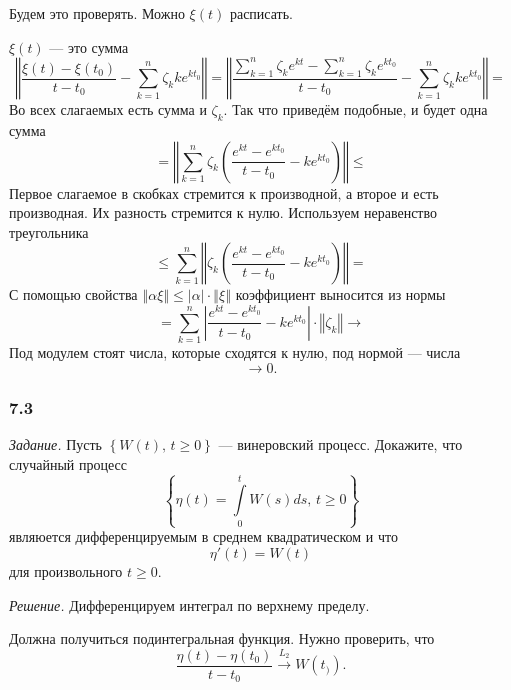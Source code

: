 Будем это проверять.
Можно $ \xi \left( t \right) $ расписать.

$ \xi \left( t \right) $ --- это сумма
$$ \left \Vert
    \frac{ \xi \left( t \right) - \xi \left( t_0 \right) }{t - t_0} -
    \sum \limits_{k = 1}^n \zeta_k k e^{kt_0} \right \Vert =
  \left \Vert
    \frac{ \sum \limits_{k = 1}^n \zeta_k e^{kt} - \sum \limits_{k = 1}^n \zeta_k e^{kt_0}}{t - t_0} -
    \sum \limits_{k = 1}^n \zeta_k ke^{kt_0} \right \Vert =$$
Во всех слагаемых есть сумма и $ \zeta_k$.
Так что приведём подобные, и будет одна сумма
$$= \left \Vert
    \sum \limits_{k = 1}^n \zeta_k \left( \frac{e^{kt} - e^{kt_0}}{t - t_0} - ke^{kt_0} \right)
  \right \Vert \leq$$
Первое слагаемое в скобках стремится к производной, а второе и есть производная.
Их разность стремится к нулю.
Используем неравенство треугольника
$$ \leq \sum \limits_{k = 1}^n
  \left \Vert \zeta_k \left( \frac{e^{kt} - e^{kt_0}}{t - t_0} - ke^{kt_0} \right) \right \Vert =$$
С помощью свойства
$ \left \Vert \alpha \xi \right \Vert \leq
  \left| \alpha \right| \cdot \left \Vert \xi \right \Vert $
коэффициент выносится из нормы
$$= \sum \limits_{k = 1}^n
    \left| \frac{e^{kt} - e^{kt_0}}{t - t_0} - ke^{kt_0} \right| \cdot
    \left \Vert \zeta_k \right \Vert \to$$
Под модулем стоят числа, которые сходятся к нулю, под нормой --- числа
$$ \to 0.$$

\subsubsection*{7.3}

\textit{Задание.}
Пусть $ \left\{ W \left( t \right), \, t \geq 0 \right\} $ --- винеровский процесс.
Докажите, что случайный процесс
$$ \left\{ \eta \left( t \right) = \int \limits_0^t W \left( s \right) ds, \, t \geq 0 \right\} $$
являюется дифференцируемым в среднем квадратическом и что
$$ \eta' \left( t \right) =
  W \left( t \right) $$
для произвольного $t \geq 0$.

\textit{Решение.}
Дифференцируем интеграл по верхнему пределу.

Должна получиться подинтегральная функция.
Нужно проверить, что
$$ \frac{ \eta \left( t \right) - \eta \left( t_0 \right) }{t - t_0} \overset{L_2}{ \to }
  W \left( t_) \right).$$

